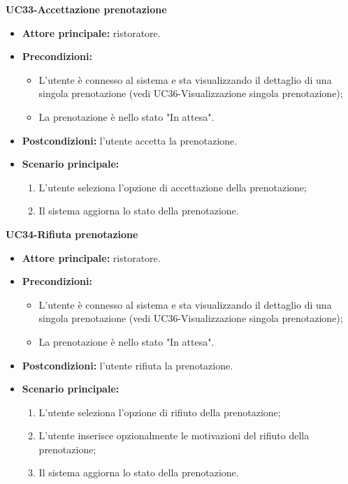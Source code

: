 \pagebreak
\textbf{UC33-Accettazione prenotazione}
\begin{itemize}
\item \textbf{Attore principale:} ristoratore.
\item \textbf{Precondizioni:} 
\begin{itemize}
        \item L'utente è connesso al sistema e sta visualizzando il dettaglio di una singola prenotazione (vedi UC36-Visualizzazione singola prenotazione);
        \item La prenotazione è nello stato "In attesa".
\end{itemize}
\item \textbf{Postcondizioni:} l'utente accetta la prenotazione.
\item \textbf{Scenario principale:}
\begin{enumerate}
    \item L'utente seleziona l'opzione di accettazione della prenotazione;
    \item Il sistema aggiorna lo stato della prenotazione.
\end{enumerate}
\end{itemize}

\textbf{UC34-Rifiuta prenotazione}
\begin{itemize}
\item \textbf{Attore principale:} ristoratore.
\item \textbf{Precondizioni:} 
\begin{itemize}
        \item L'utente è connesso al sistema e sta visualizzando il dettaglio di una singola prenotazione (vedi UC36-Visualizzazione singola prenotazione);
        \item La prenotazione è nello stato "In attesa".
\end{itemize}
\item \textbf{Postcondizioni:} l'utente rifiuta la prenotazione.
\item \textbf{Scenario principale:}
\begin{enumerate}
    \item L'utente seleziona l'opzione di rifiuto della prenotazione;
    \item L'utente inserisce opzionalmente le motivazioni del rifiuto della prenotazione;
    \item Il sistema aggiorna lo stato della prenotazione.
\end{enumerate}
\end{itemize}

